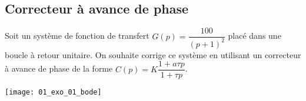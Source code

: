 \ifprof
\else
\ifcolle
\else
{}
\fi
\fi






\subsection*{Correcteur à avance de phase}

\ifprof
\else
Soit un système de fonction de transfert $G(p)=\dfrac{100}{\left(p+1\right)^2}$ placé dans une boucle à retour unitaire. On souhaite corrige ce système en utilisant un correcteur à avance de phase de la forme $C(p)=K\dfrac{1+a\tau p}{1+\tau p}$.
\fi

\ifprof
\else
\begin{center}
\texttt{[image: 01\_exo\_01\_bode]}
\end{center}
\fi

